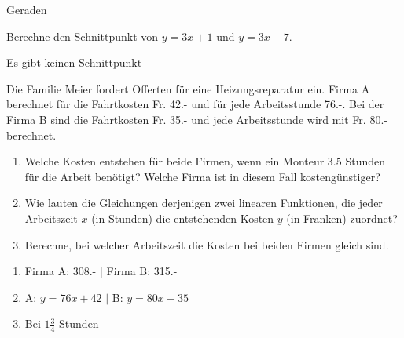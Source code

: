 \documentclass[11pt,a4paper]{article}
\begin{document}
\begin{exerciseseries}{Geraden}
  \begin{exercise}
    Berechne den Schnittpunkt von \mbox{$y=3x+1$} und \mbox{$y=3x-7$}.
  \end{exercise}
  \begin{solution}
    Es gibt keinen Schnittpunkt
  \end{solution}

  \begin{exercise}
    Die Familie Meier fordert Offerten f\"ur eine Heizungsreparatur
    ein. Firma A berechnet f\"ur die Fahrtkosten Fr. 42.- und f\"ur
    jede Arbeitsstunde 76.-. Bei der Firma B sind die Fahrtkosten
    Fr. 35.- und jede Arbeitsstunde wird mit Fr. 80.- berechnet.
    \begin{enumerate}[label=\alph*)]
    \item Welche Kosten entstehen f\"ur beide Firmen, wenn ein Monteur
      3.5 Stunden
      f\"ur die Arbeit benötigt? Welche Firma ist in diesem Fall
      kostengünstiger?

    \item Wie lauten die Gleichungen derjenigen zwei linearen
      Funktionen, die jeder Arbeitszeit $x$ (in Stunden) die
      entstehenden Kosten $y$ (in Franken) zuordnet?

    \item Berechne, bei welcher Arbeitszeit die Kosten bei beiden
      Firmen gleich sind.
    \end{enumerate}
  \end{exercise}
  \begin{solution}
    \begin{enumerate}[label=\alph*)]
    \item Firma A: 308.- $|$ Firma B: 315.-
    \item A: $y=76x+42$ $|$ B: $y=80x+35$
    \item Bei $1\frac{3}{4}$ Stunden
    \end{enumerate}
  \end{solution}
\end{exerciseseries}
\end{document}
